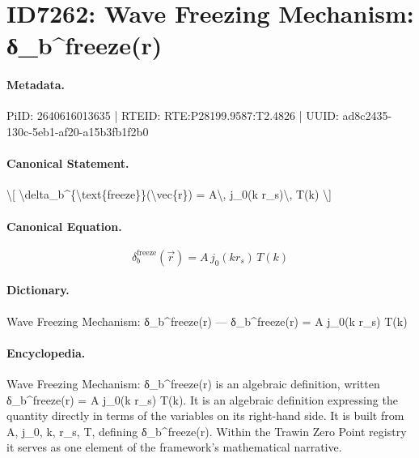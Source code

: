 \section*{ID7262: Wave Freezing Mechanism: δ\_b\textasciicircum{}freeze(r)}
\paragraph{Metadata.}
PiID: 2640616013635 | RTEID: RTE:P28199.9587:T2.4826 | UUID: ad8c2435-130c-5eb1-af20-a15b3fb1f2b0

\paragraph{Canonical Statement.}
\textbackslash{}[ \textbackslash{}delta\_b\textasciicircum{}\{\textbackslash{}text\{freeze\}\}(\textbackslash{}vec\{r\}) = A\textbackslash{}, j\_0(k r\_s)\textbackslash{}, T(k) \textbackslash{}]

\paragraph{Canonical Equation.}
\[
\delta_b^{\text{freeze}}(\vec{r}) = A\, j_0(k r_s)\, T(k)
\]

\paragraph{Dictionary.}
Wave Freezing Mechanism: δ\_b\textasciicircum{}freeze(r) — δ\_b\textasciicircum{}freeze(r) = A j\_0(k r\_s) T(k)

\paragraph{Encyclopedia.}
Wave Freezing Mechanism: δ\_b\textasciicircum{}freeze(r) is an algebraic definition, written δ\_b\textasciicircum{}freeze(r) = A j\_0(k r\_s) T(k). It is an algebraic definition expressing the quantity directly in terms of the variables on its right-hand side. It is built from A, j\_0, k, r\_s, T, defining δ\_b\textasciicircum{}freeze(r). Within the Trawin Zero Point registry it serves as one element of the framework's mathematical narrative.
